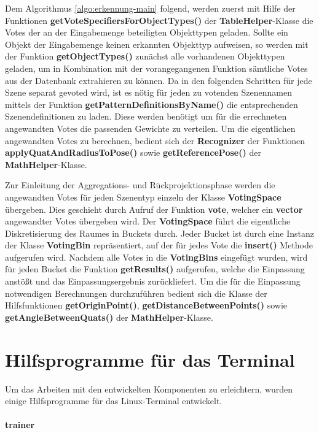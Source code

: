 Dem Algorithmus \vref{algo:erkennung-main} folgend, werden zuerst mit Hilfe der Funktionen \textbf{getVoteSpecifiersForObjectTypes()} der \textbf{TableHelper}-Klasse die Votes der an der Eingabemenge beteiligten Objekttypen geladen.
Sollte ein Objekt der Eingabemenge keinen erkannten Objekttyp aufweisen, so werden mit der Funktion \textbf{getObjectTypes()} zunächst alle vorhandenen Objekttypen geladen, um in Kombination mit der vorangegangenen Funktion sämtliche Votes aus der Datenbank extrahieren zu können.
Da in den folgenden Schritten für jede Szene separat gevoted wird, ist es nötig für jeden zu votenden Szenennamen mittels der Funktion \textbf{getPatternDefinitionsByName()} die entsprechenden Szenendefinitionen zu laden.
Diese werden benötigt um für die errechneten angewandten Votes die passenden Gewichte zu verteilen.
Um die eigentlichen angewandten Votes zu berechnen, bedient sich der \textbf{Recognizer} der Funktionen \textbf{applyQuatAndRadiusToPose()} sowie \textbf{getReferencePose()} der \textbf{MathHelper}-Klasse.

Zur Einleitung der Aggregations- und Rückprojektionsphase werden die angewandten Votes für jeden Szenentyp einzeln der Klasse \textbf{VotingSpace} übergeben.
Dies geschieht durch Aufruf der Funktion \textbf{vote}, welcher ein \textbf{vector} angewandter Votes übergeben wird.
Der \textbf{VotingSpace} führt die eigentliche Diskretisierung des Raumes in Buckets durch.
Jeder Bucket ist durch eine Instanz der Klasse \textbf{VotingBin} repräsentiert, auf der für jedes Vote die \textbf{insert()} Methode aufgerufen wird.
Nachdem alle Votes in die \textbf{VotingBins} eingefügt wurden, wird für jeden Bucket die Funktion \textbf{getResults()} aufgerufen, welche die Einpassung anstößt und das Einpassungsergebnis zurückliefert.
Um die für die Einpassung notwendigen Berechnungen durchzuführen bedient sich die Klasse der Hilfsfunktionen \textbf{getOriginPoint()}, \textbf{getDistanceBetweenPoints()} sowie \textbf{getAngleBetweenQuats()} der \textbf{MathHelper}-Klasse.

\section{Hilfsprogramme für das Terminal}

Um das Arbeiten mit den entwickelten Komponenten zu erleichtern, wurden einige Hilfsprogramme für das Linux-Terminal entwickelt.

\paragraph{trainer}

